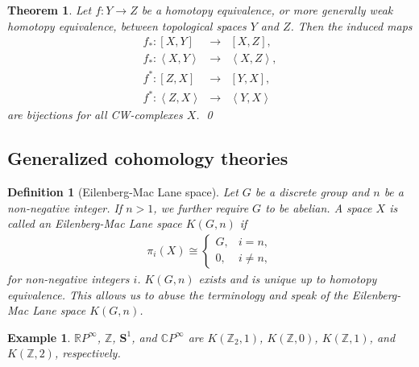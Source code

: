 \documentclass[sort&compress]{elsarticle}
\theoremstyle{theoremstyle}
\newtheorem{thm}[nul]{Theorem}
\theoremstyle{framedtheoremstyle}
\theoremstyle{definitionstyle}
\newtheorem{dfn}[nul]{Definition}%
\theoremstyle{definitionstyle}
\theoremstyle{definitionstyle}
\theoremstyle{definitionstyle}
\newtheorem{exm}[nul]{Example}
\theoremstyle{nameddefinitionstyle}
\theoremstyle{framednameddefinitionstyle}
\theoremstyle{proofstyle}
\theoremstyle{definitionstyle}
\newcommand{\fromto}{\rightarrow}
\newcommand{\ZZZ}{\mathbb{Z}}
\newcommand{\RRR}{\mathbb{R}}
\newcommand{\CCC}{\mathbb{C}}
\renewcommand{\SS}{\mathbf{S}}
\newcommand{\isomorphic}{\cong}
\newcommand{\angles}[1]{\left\langle #1 \right\rangle}
\newcommand{\brackets}[1]{\left[ #1 \right]}
\begin{document}
\begin{appendices}
\begin{thm}
Let $f: Y \fromto Z$ be a homotopy equivalence, or more generally weak homotopy equivalence, between topological spaces $Y$ and $Z$. Then the induced maps
\begin{eqnarray}
f_\ast: \brackets{X, Y} &\fromto& \brackets{X, Z}, \\
f_\ast: \angles{X, Y} &\fromto& \angles{X, Z}, \\
f^\ast: \brackets{Z, X} &\fromto& \brackets{Y,X}, \\
f^\ast: \angles{Z, X} &\fromto& \angles{Y, X}
\end{eqnarray}
are bijections for all CW-complexes $X$.
\qed\end{thm}





\subsection{Generalized cohomology theories\label{subapp:generalized_cohomology_theories}}


\begin{dfn}[Eilenberg-Mac Lane space]
Let $G$ be a discrete group and $n$ be a non-negative integer. If $n>1$, we further require $G$ to be abelian. A space $X$ is called an Eilenberg-Mac Lane space $K(G, n)$ if
\begin{eqnarray}
\pi_i(X) \isomorphic \begin{cases}
G, & i=n, \\
0, & i \neq n,
\end{cases}
\end{eqnarray}
for non-negative integers $i$.
$K(G,n)$ exists and is unique up to homotopy equivalence. This allows us to abuse the terminology and speak of \emph{the} Eilenberg-Mac Lane space $K(G,n)$.
\end{dfn}

\begin{exm}
$\RRR P^\infty$, $\ZZZ$, $\SS^1$, and $\CCC P^\infty$ are $K(\ZZZ_2, 1)$, $K(\ZZZ,0)$, $K(\ZZZ, 1)$, and $K(\ZZZ, 2)$, respectively.\label{exm:Eilenberg_Mac_Lane_spaces}
\end{exm}


\end{appendices}
\end{document}
